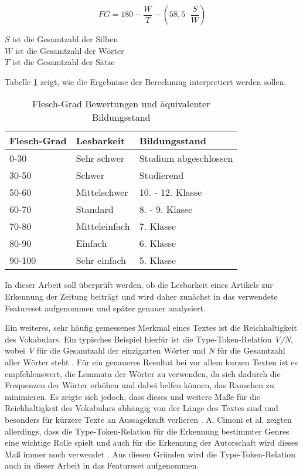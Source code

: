 \[ FG = 180 - \frac{W}{T} - (58,5 \cdot \frac{S}{W}) \]

$ S $ ist die Gesamtzahl der Silben\\
$ W $ ist die Gesamtzahl der Wörter\\
$ T $ ist die Gesamtzahl der Sätze

Tabelle \ref{fleschgrad} zeigt, wie die Ergebnisse der Berechnung interpretiert werden sollen.

\begin{table}[h]
\centering
\begin{tabular}[t]{lll}
\toprule
Flesch-Grad & Lesbarkeit & Bildungsstand\\
\midrule
0-30 & Sehr schwer & Studium abgeschlossen\\
30-50 & Schwer & Studierend\\
50-60 & Mittelschwer & 10. - 12. Klasse\\
60-70 & Standard & 8. - 9. Klasse\\
70-80 & Mitteleinfach & 7. Klasse\\
80-90 & Einfach & 6. Klasse\\
90-100 & Sehr einfach & 5. Klasse\\
\bottomrule
\end{tabular}
\caption{Flesch-Grad Bewertungen und äquivalenter Bildungsstand \cite[S.~406]{courtis2002reading}}
\label{fleschgrad}
\end{table}

In dieser Arbeit soll überprüft werden, ob die Lesbarkeit eines Artikels zur Erkennung der Zeitung beiträgt und wird daher zunächst in das verwendete Featureset aufgenommen und später genauer analysiert.

Ein weiteres, sehr häufig gemessenes Merkmal eines Textes ist die Reichhaltigkeit des Vokabulars. Ein typisches Beispiel hierfür ist die Type-Token-Relation \textit{V/N}, wobei \textit{V} für die Gesamtzahl der einzigarten Wörter und \textit{N} für die Gesamtzahl aller Wörter steht \cite[S.~540]{stamatatos2009survey}. Für ein genaueres Resultat bei vor allem kurzen Texten ist es empfehlenswert, die Lemmata der Wörter zu verwenden, da sich dadurch die Frequenzen der Wörter erhöhen und dabei helfen können, das Rauschen zu minimieren. Es zeigte sich jedoch, dass dieses und weitere Maße für die Reichhaltigkeit des Vokabulars abhängig von der Länge des Textes sind und besonders für kürzere Texte an Aussagekraft verlieren \cite{tweedie1998variable}. A. Cimoni et al. zeigten allerdings, dass die Type-Token-Relation für die Erkennung bestimmter Genres eine wichtige Rolle spielt \cite[S.~5]{cimino2017identifying} und auch für die Erkennung der Autorschaft wird dieses Maß immer noch verwendet \cite[S.~540]{stamatatos2009survey}. Aus diesen Gründen wird die Type-Token-Relation auch in dieser Arbeit in das Featureset aufgenommen.

